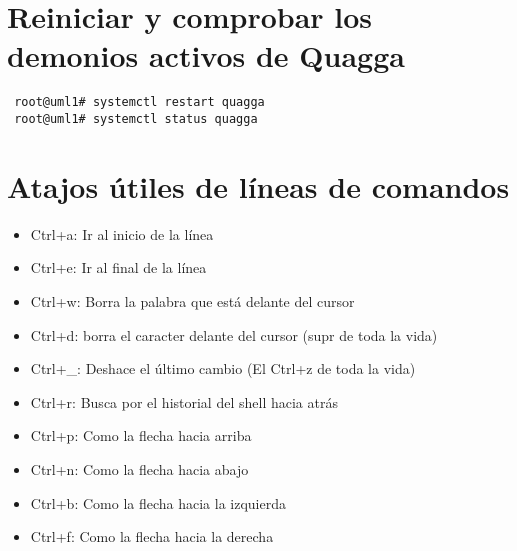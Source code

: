 \documentclass{article}
\begin{document}
\section{Reiniciar y comprobar los demonios activos de Quagga}
\begin{verbatim}
 root@uml1# systemctl restart quagga
 root@uml1# systemctl status quagga
\end{verbatim}

\section{Atajos útiles de líneas de comandos}
\begin{itemize}
  \item Ctrl+a: Ir al inicio de la línea
  \item Ctrl+e: Ir al final de la línea
  \item Ctrl+w: Borra la palabra que está delante del cursor
  \item Ctrl+d: borra el caracter delante del cursor (supr de toda la vida)
  \item Ctrl+\_: Deshace el último cambio (El Ctrl+z de toda la vida)
  \item Ctrl+r: Busca por el historial del shell hacia atrás
  \item Ctrl+p: Como la flecha hacia arriba
  \item Ctrl+n: Como la flecha hacia abajo
  \item Ctrl+b: Como la flecha hacia la izquierda
  \item Ctrl+f: Como la flecha hacia la derecha
\end{itemize}
\end{document}
